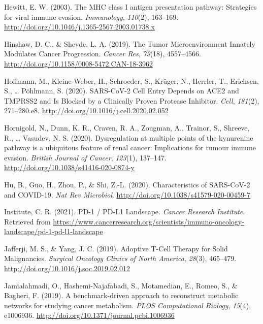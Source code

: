 \documentclass[12pt,twoside,openany,\mydriver]{thesis}  %
\begin{document}
\leavevmode\hypertarget{ref-hewitt_mhc_2003}{}%
Hewitt, E. W. (2003). The MHC class I antigen presentation pathway: Strategies for viral immune evasion. \emph{Immunology}, \emph{110}(2), 163--169. \url{http://doi.org/10.1046/j.1365-2567.2003.01738.x}

\leavevmode\hypertarget{ref-hinshaw_tumor_2019}{}%
Hinshaw, D. C., \& Shevde, L. A. (2019). The Tumor Microenvironment Innately Modulates Cancer Progression. \emph{Cancer Res}, \emph{79}(18), 4557--4566. \url{http://doi.org/10.1158/0008-5472.CAN-18-3962}

\leavevmode\hypertarget{ref-hoffmann_sars-cov-2_2020}{}%
Hoffmann, M., Kleine-Weber, H., Schroeder, S., Krüger, N., Herrler, T., Erichsen, S., \ldots{} Pöhlmann, S. (2020). SARS-CoV-2 Cell Entry Depends on ACE2 and TMPRSS2 and Is Blocked by a Clinically Proven Protease Inhibitor. \emph{Cell}, \emph{181}(2), 271--280.e8. \url{http://doi.org/10.1016/j.cell.2020.02.052}

\leavevmode\hypertarget{ref-hornigold_dysregulation_2020}{}%
Hornigold, N., Dunn, K. R., Craven, R. A., Zougman, A., Trainor, S., Shreeve, R., \ldots{} Vasudev, N. S. (2020). Dysregulation at multiple points of the kynurenine pathway is a ubiquitous feature of renal cancer: Implications for tumour immune evasion. \emph{British Journal of Cancer}, \emph{123}(1), 137--147. \url{http://doi.org/10.1038/s41416-020-0874-y}

\leavevmode\hypertarget{ref-hu_characteristics_2020}{}%
Hu, B., Guo, H., Zhou, P., \& Shi, Z.-L. (2020). Characteristics of SARS-CoV-2 and COVID-19. \emph{Nat Rev Microbiol}. \url{http://doi.org/10.1038/s41579-020-00459-7}

\leavevmode\hypertarget{ref-cancer_research_institute_pd-1_2021}{}%
Institute, C. R. (2021). PD-1 / PD-L1 Landscape. \emph{Cancer Research Institute}. Retrieved from \url{https://www.cancerresearch.org/scientists/immuno-oncology-landscape/pd-1-pd-l1-landscape}

\leavevmode\hypertarget{ref-jafferji_adoptive_2019}{}%
Jafferji, M. S., \& Yang, J. C. (2019). Adoptive T-Cell Therapy for Solid Malignancies. \emph{Surgical Oncology Clinics of North America}, \emph{28}(3), 465--479. \url{http://doi.org/10.1016/j.soc.2019.02.012}

\leavevmode\hypertarget{ref-jamialahmadi_benchmark-driven_2019}{}%
Jamialahmadi, O., Hashemi-Najafabadi, S., Motamedian, E., Romeo, S., \& Bagheri, F. (2019). A benchmark-driven approach to reconstruct metabolic networks for studying cancer metabolism. \emph{PLOS Computational Biology}, \emph{15}(4), e1006936. \url{http://doi.org/10.1371/journal.pcbi.1006936}
\end{document}
